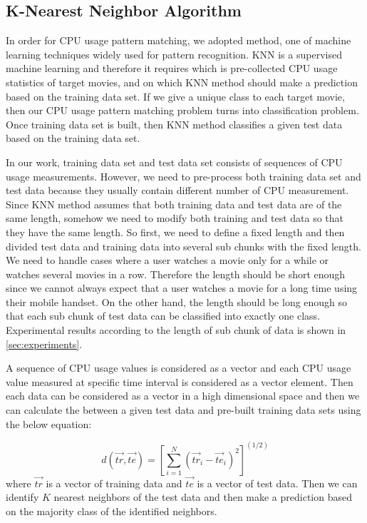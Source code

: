 \subsection{K-Nearest Neighbor Algorithm}
 
In order for CPU usage pattern matching, we adopted  method, one of machine learning techniques widely used for pattern recognition.
KNN is a supervised machine learning and therefore it requires  which is pre-collected CPU usage statistics of target movies, and  on which KNN method should make a prediction based on the training data set.
If we give a unique class to each target movie, then our CPU usage pattern matching problem turns into classification problem. 
Once training data set is built, then KNN method classifies a given test data based on the training data set. 

In our work, training data set and test data set consists of sequences of CPU usage measurements. 
However, we need to pre-process both training data set and test data because they usually contain different number of CPU measurement.
Since KNN method assumes that both training data and test data are of the same length, somehow we need to modify both training and test data so that they have the same length. 
So first, we need to define a fixed length and then divided test data and training data into several sub chunks with the fixed length. 
We need to handle cases where a user watches a movie only for a while or watches several movies in a row. 
Therefore the length should be short enough since we cannot always expect that a user watches a movie for a long time using their mobile handset.  
On the other hand, the length should be long enough so that each sub chunk of test data can be classified into exactly one class. 
Experimental results according to the length of sub chunk of data is shown in \ref{sec:experiments}.

A sequence of CPU usage values is considered as a vector and each CPU usage value measured at specific time interval is considered as a vector element. 
Then each data can be considered as a vector in a high dimensional space and then we can calculate the  between a given test data and pre-built training data sets using the below equation: 

\[
d( \vec{tr}, \vec{te} ) = [ \sum_{i=1}^{N} (\vec{tr}_i - \vec{te}_i)^2  ]^{(1/2)}
\]
where $\vec{tr}$ is a vector of training data and $\vec{te}$ is a vector of test data. 
Then we can identify $K$ nearest neighbors of the test data and then make a prediction based on the majority class of the identified neighbors. 


\begin{comment}
There exist a few other machine learning methods such as \term{Support Vector Machine} or \term{Perceptron}, they have couple of drawbacks when applied to our pattern matching problem: 

(1) Features are not fixed 

Consider a sequence of CPU usage values as a vector and then KNN tries to find out k nearest vectors 
\end{comment}